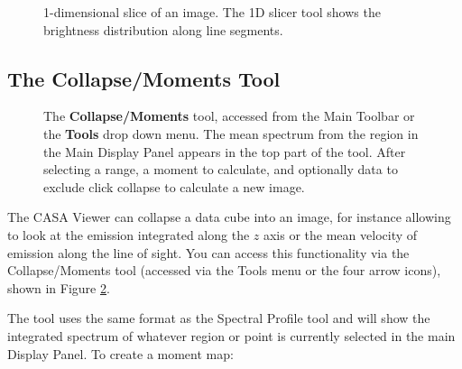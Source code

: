 \begin{figure}[h!]
\begin{center}
\caption{\label{fig:viewer_slicer} 1-dimensional slice of an
  image. The 1D slicer tool shows the brightness distribution along
  line segments.} 
\hrulefill
\end{center}
\end{figure}


\subsection{The Collapse/Moments Tool}
\label{section:display.image.collapse}

\begin{figure}[h!]
\begin{center}
\caption{\label{fig:viewer_collapse} The {\bf Collapse/Moments} tool, accessed from
the Main Toolbar or the {\bf Tools} drop down menu. The mean spectrum from the region 
in the Main Display Panel appears in the top part of the tool. After selecting a range,
a moment to calculate, and optionally data to exclude click collapse to calculate a new image.}
\hrulefill
\end{center}
\end{figure}

The CASA Viewer can collapse a data cube into an image, for instance allowing to look at the emission 
integrated along the $z$ axis or the mean velocity of emission along the line of sight. You can
access this functionality via the Collapse/Moments tool (accessed via the Tools menu or the four arrow
icons), shown in Figure \ref{fig:viewer_collapse}.

The tool uses the same format as the Spectral Profile tool and will show the integrated spectrum of whatever region
or point is currently selected in the main Display Panel. To create a moment map:

